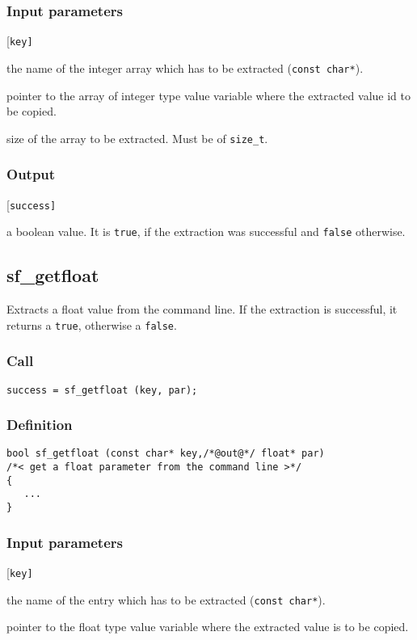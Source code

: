 \subsubsection*{Input parameters}
\begin{desclist}{\tt }{\quad}[\tt key]
   \setlength\itemsep{0pt}
   \item[key] the name of the integer array which has to be extracted (\texttt{const char*}).
   \item[par] pointer to the array of integer type value variable where the extracted value id to be copied. 
   \item[n] size of the array to be extracted. Must be of \texttt{size\_t}.
\end{desclist}

\subsubsection*{Output}
\begin{desclist}{\tt }{\quad}[\tt success]
   \setlength\itemsep{0pt}
   \item[success]  a boolean value. It is \texttt{true}, if the extraction was successful and \texttt{false} otherwise. 
\end{desclist}




\subsection{{sf\_getfloat}}
Extracts a float value from the command line. If the extraction is successful, it returns a \texttt{true}, otherwise a \texttt{false}.  

\subsubsection*{Call}
\begin{verbatim}success = sf_getfloat (key, par);\end{verbatim}

\subsubsection*{Definition}
\begin{verbatim}
bool sf_getfloat (const char* key,/*@out@*/ float* par) 
/*< get a float parameter from the command line >*/
{
   ...
}
\end{verbatim}

\subsubsection*{Input parameters}
\begin{desclist}{\tt }{\quad}[\tt key]
   \setlength\itemsep{0pt}
   \item[key] the name of the entry which has to be extracted (\texttt{const char*}).
   \item[par] pointer to the float type value variable where the extracted value is to be copied.
\end{desclist}

